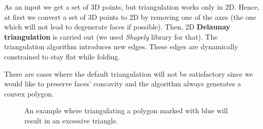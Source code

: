 As an input we get a set of 3D points, but triangulation works only in 2D.
Hence, at first we convert a set of 3D points to 2D by removing one of the axes (the one which will not lead to degenerate faces if possible).
Then, 2D \textbf{Delaunay triangulation} is carried out (we used \textit{Shapely} library for that).
The triangulation algorithm introduces new edges. These edges are dynamically constrained to stay flat while folding.

There are cases where the default triangulation will not be satisfactory
since we would like to preserve faces' concavity and the algorithm always generates a convex polygon.

\begin{figure}[H]
	\caption{An example where triangulating a polygon marked with blue will result in an excessive triangle.}
	\centering
	\qquad\qquad\qquad\qquad\qquad\qquad\qquad
	\qquad
\end{figure}

